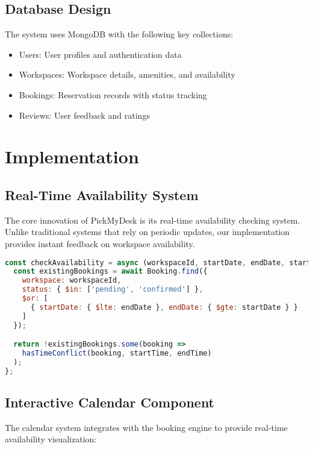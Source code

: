 \documentclass[12pt,a4paper]{article}
\begin{document}
\subsection{Database Design}

The system uses MongoDB with the following key collections:
\begin{itemize}
    \item Users: User profiles and authentication data
    \item Workspaces: Workspace details, amenities, and availability
    \item Bookings: Reservation records with status tracking
    \item Reviews: User feedback and ratings
\end{itemize}

\section{Implementation}

\subsection{Real-Time Availability System}

The core innovation of PickMyDesk is its real-time availability checking system. Unlike traditional systems that rely on periodic updates, our implementation provides instant feedback on workspace availability.

\begin{lstlisting}[language=JavaScript, caption=Availability checking algorithm]
const checkAvailability = async (workspaceId, startDate, endDate, startTime, endTime) => {
  const existingBookings = await Booking.find({
    workspace: workspaceId,
    status: { $in: ['pending', 'confirmed'] },
    $or: [
      { startDate: { $lte: endDate }, endDate: { $gte: startDate } }
    ]
  });

  return !existingBookings.some(booking =>
    hasTimeConflict(booking, startTime, endTime)
  );
};
\end{lstlisting}

\subsection{Interactive Calendar Component}

The calendar system integrates with the booking engine to provide real-time availability visualization:
\end{document}
